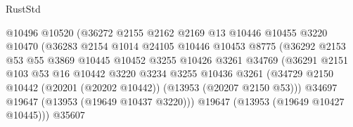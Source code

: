 \begin{lexlean}{RustStd}
\begin{coremodule}
                                      @10496
                                      @10520
                                      (@36272
                                        @2155
                                        @2162
                                        @2169
                                        @13
                                        @10446
                                        @10455
                                        @3220
                                        @10470
                                        (@36283
                                          @2154
                                          @1014
                                          @24105
                                          @10446
                                          @10453
                                          @8775
                                          (@36292
                                            @2153
                                            @53
                                            @55
                                            @3869
                                            @10445
                                            @10452
                                            @3255
                                            @10426
                                            @3261
                                            @34769
                                            (@36291
                                              @2151
                                              @103
                                              @53
                                              @16
                                              @10442
                                              @3220
                                              @3234
                                              @3255
                                              @10436
                                              @3261
                                              (@34729
                                                @2150
                                                @10442
                                                (@20201 (@20202 @10442))
                                                (@13953 (@20207 @2150 @53)))
                                              @34697
                                              @19647
                                              (@13953 (@19649 @10437 @3220)))
                                            @19647
                                            (@13953 (@19649 @10427 @10445)))
                                          @35607

\end{coremodule}
\end{lexlean}
